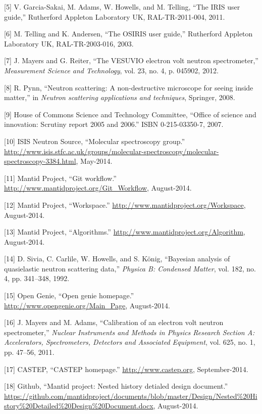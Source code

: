 \documentclass[paper=a4, fontsize=11pt]{scrartcl}	%
\numberwithin{equation}{section}															%
\numberwithin{figure}{section}																%
\numberwithin{table}{section}
\begin{document}
{[}5{]} V. Garcia-Sakai, M. Adams, W. Howells, and M. Telling, ``The
IRIS user guide,'' Rutherford Appleton Laboratory UK, RAL-TR-2011-004,
2011.

{[}6{]} M. Telling and K. Andersen, ``The OSIRIS user guide,''
Rutherford Appleton Laboratory UK, RAL-TR-2003-016, 2003.

{[}7{]} J. Mayers and G. Reiter, ``The VESUVIO electron volt neutron
spectrometer,'' \emph{Measurement Science and Technology}, vol. 23, no.
4, p. 045902, 2012.

{[}8{]} R. Pynn, ``Neutron scattering: A non-destructive microscope for
seeing inside matter,'' in \emph{Neutron scattering applications and
techniques}, Springer, 2008.

{[}9{]} House of Commons Science and Technology Committee, ``Office of
science and innovation: Scrutiny report 2005 and 2006.'' ISBN
0-215-03350-7, 2007.

{[}10{]} ISIS Neutron Source, ``Molecular spectroscopy group.''
\url{http://www.isis.stfc.ac.uk/groups/molecular-spectroscopy/molecular-spectroscopy-3384.html},
May-2014.

{[}11{]} Mantid Project, ``Git workflow.''
\url{http://www.mantidproject.org/Git_Workflow}, August-2014.

{[}12{]} Mantid Project, ``Workspace.''
\url{http://www.mantidproject.org/Workspace}, August-2014.

{[}13{]} Mantid Project, ``Algorithms.''
\url{http://www.mantidproject.org/Algorithm}, August-2014.

{[}14{]} D. Sivia, C. Carlile, W. Howells, and S. K{ö}nig, ``Bayesian
analysis of quasielastic neutron scattering data,'' \emph{Physica B:
Condensed Matter}, vol. 182, no. 4, pp. 341--348, 1992.

{[}15{]} Open Genie, ``Open genie homepage.''
\url{http://www.opengenie.org/Main_Page}, August-2014.

{[}16{]} J. Mayers and M. Adams, ``Calibration of an electron volt
neutron spectrometer,'' \emph{Nuclear Instruments and Methods in Physics
Research Section A: Accelerators, Spectrometers, Detectors and
Associated Equipment}, vol. 625, no. 1, pp. 47--56, 2011.

{[}17{]} CASTEP, ``CASTEP homepage.'' \url{http://www.castep.org},
September-2014.

{[}18{]} Github, ``Mantid project: Nested history detialed design
document.''
\url{https://github.com/mantidproject/documents/blob/master/Design/Nested\%20History\%20Detailed\%20Design\%20Document.docx},
August-2014.
\end{document}
